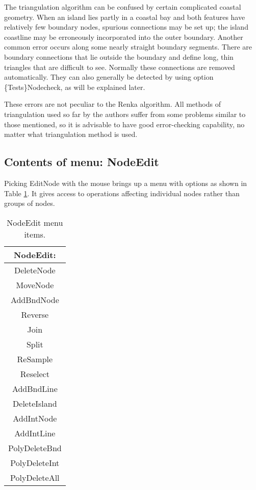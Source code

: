 \documentclass{article}
\begin{document}
The triangulation algorithm can be confused by certain complicated coastal geometry. When an island lies partly in a coastal bay and both features have relatively few boundary nodes, spurious connections may be set up; the island coastline may be erroneously incorporated into the outer boundary. Another common error occurs along some nearly straight boundary segments. There are boundary connections that lie outside the boundary and define long, thin triangles that are difficult to see. Normally these connections are removed automatically. They can also generally be detected by using option \{Tests\}Nodecheck, as will be explained later.

These errors are not peculiar to the Renka algorithm. All methods of triangulation used so far by the authors suffer from some problems similar to those mentioned, so it is advisable to have good error-checking capability, no matter what triangulation method is used.


\subsection{Contents of menu: NodeEdit}
Picking EditNode with the mouse brings up a menu with options as shown in Table \ref{tab:NODEEDIT}. It gives access to operations affecting individual nodes rather than groups of nodes. 

\begin{table}[htb!]
 \caption{NodeEdit menu items.}
  \begin{center}
   \begin{tabular}{|c|}
    \hline
NodeEdit:\\     \hline
DeleteNode \\ MoveNode \\     \hline
AddBndNode \\ Reverse \\ Join \\ Split \\ ReSample \\ Reselect \\ AddBndLine \\ DeleteIsland \\     \hline
AddIntNode \\ AddIntLine \\     \hline
PolyDeleteBnd \\ PolyDeleteInt \\ PolyDeleteAll \\
    \hline
   \end{tabular}
   \label{tab:NODEEDIT}
  \end{center}
\end{table}
\end{document}
